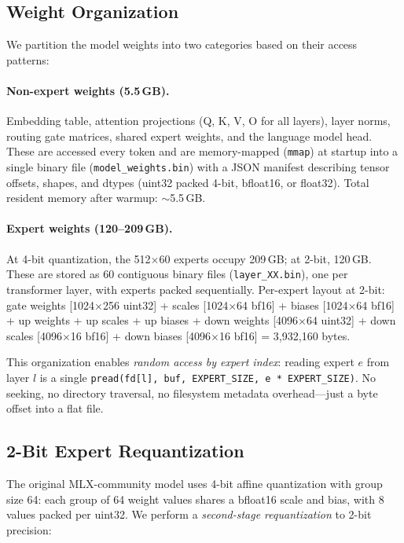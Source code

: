 \documentclass[11pt,twocolumn]{article}
\begin{document}
\subsection{Weight Organization}
\label{sec:weights}

We partition the model weights into two categories based on their access patterns:

\paragraph{Non-expert weights (5.5\,GB).}
Embedding table, attention projections (Q, K, V, O for all layers), layer norms, routing gate matrices, shared expert weights, and the language model head.
These are accessed every token and are memory-mapped (\texttt{mmap}) at startup into a single binary file (\texttt{model\_weights.bin}) with a JSON manifest describing tensor offsets, shapes, and dtypes (uint32 packed 4-bit, bfloat16, or float32).
Total resident memory after warmup: $\sim$5.5\,GB.

\paragraph{Expert weights (120--209\,GB).}
At 4-bit quantization, the 512$\times$60 experts occupy 209\,GB; at 2-bit, 120\,GB.
These are stored as 60 contiguous binary files (\texttt{layer\_XX.bin}), one per transformer layer, with experts packed sequentially.
Per-expert layout at 2-bit: gate weights [1024$\times$256 uint32] + scales [1024$\times$64 bf16] + biases [1024$\times$64 bf16] + up weights + up scales + up biases + down weights [4096$\times$64 uint32] + down scales [4096$\times$16 bf16] + down biases [4096$\times$16 bf16] = 3{,}932{,}160 bytes.

This organization enables \emph{random access by expert index}: reading expert $e$ from layer $l$ is a single \texttt{pread(fd[l], buf, EXPERT\_SIZE, e * EXPERT\_SIZE)}.
No seeking, no directory traversal, no filesystem metadata overhead---just a byte offset into a flat file.

\subsection{2-Bit Expert Requantization}
\label{sec:2bit}

The original MLX-community model uses 4-bit affine quantization with group size 64: each group of 64 weight values shares a bfloat16 scale and bias, with 8 values packed per uint32.
We perform a \emph{second-stage requantization} to 2-bit precision:
\end{document}
